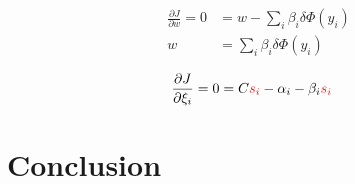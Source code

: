 \documentclass{IEEEtran}
\begin{document}
\begin{align}
    \frac{\partial J}{\partial w} = 0 &= w - \sum_i \beta_i \delta \Phi\left(y_i\right) \\
    w &= \sum_i \beta_i \delta \Phi\left(y_i\right) \nonumber
\end{align}

\begin{align}
    \frac{\partial J}{\partial \xi_i} = 0 &= C \textcolor{red}{s_i} - \alpha_i - \beta_i \textcolor{red}{s_i}
\end{align}
\section{Conclusion}



\end{document}
